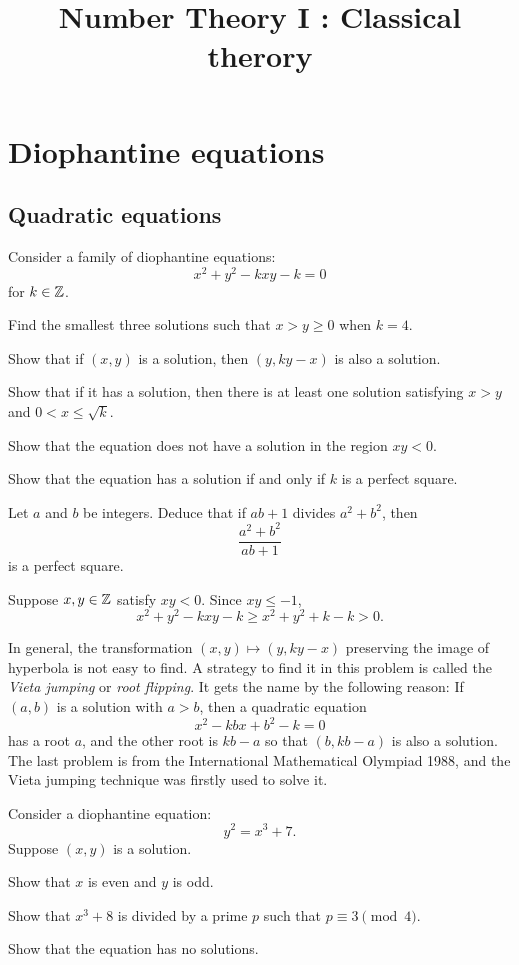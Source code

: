 \documentclass{../prb}
\title{Number Theory I : Classical therory}
\begin{document}
\maketitle
\tableofcontents

\chapter{Diophantine equations}

\section{Quadratic equations}


\begin{prb}
Consider a family of diophantine equations:
\[x^2+y^2-kxy-k=0\]
for $k\in\mathbb{Z}$.
\begin{cond}
\item Find the smallest three solutions such that $x>y\ge0$ when $k=4$.
\item Show that if $(x,y)$ is a solution, then $(y,ky-x)$ is also a solution.
\item Show that if it has a solution, then there is at least one solution satisfying $x>y$ and $0<x\le\sqrt k$.
\item Show that the equation does not have a solution in the region $xy<0$.
\item Show that the equation has a solution if and only if $k$ is a perfect square.
\item Let $a$ and $b$ be integers. Deduce that if $ab+1$ divides $a^2+b^2$, then \[\frac{a^2+b^2}{ab+1}\]is a perfect square.
\end{cond}
\end{prb}
\begin{sol}
\item
\item
\item
Suppose $x,y\in\mathbb{Z}$ satisfy $xy<0$.
Since $xy\le-1$,
\[x^2+y^2-kxy-k\ge x^2+y^2+k-k>0.\]
\item
\end{sol}
\begin{note}
In general, the transformation $(x,y)\mapsto(y,ky-x)$ preserving the image of hyperbola is not easy to find.
A strategy to find it in this problem is called the \emph{Vieta jumping} or \emph{root flipping}.
It gets the name by the following reason:
If $(a,b)$ is a solution with $a>b$, then a quadratic equation \[x^2-kbx+b^2-k=0\] has a root $a$, and the other root is $kb-a$ so that $(b,kb-a)$ is also a solution.
The last problem is from the International Mathematical Olympiad 1988, and the Vieta jumping technique was firstly used to solve it.
\end{note}

\begin{prb}
Consider a diophantine equation:
\[y^2=x^3+7.\]
Suppose $(x,y)$ is a solution.
\begin{cond}
\item Show that $x$ is even and $y$ is odd.
\item Show that $x^3+8$ is divided by a prime $p$ such that $p\equiv3\pmod{4}$.
\item Show that the equation has no solutions.
\end{cond}
\end{prb}
\end{document}
